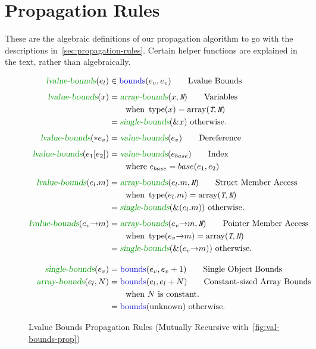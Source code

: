 \chapter{Propagation Rules}
\label{app:propagation-rules}

These are the algebraic definitions of our propagation algorithm to go
with the descriptions in~\autoref{sec:propagation-rules}. Certain
helper functions are explained in the text, rather than
algebraically.

\begin{figure}[ht]
\begin{align*}
  \lbounds(e_l) &\in \mbounds(e_v, e_v) \tag*{Lvalue Bounds} \\[1ex]
  \lbounds(x) &= \abounds(x, \mv{N}) \tag*{Variables} \\
                & \qquad \text{when } \typeof(x) = \arr(\mv{T}, \mv{N}) \\
                &= \sbounds(\addrof x) \text{ otherwise.} \\[1ex]
  \lbounds(\deref e_v) &= \vbounds(e_v) \tag*{Dereference} \\[1ex]
  \lbounds(e_1[e_2]) &= \vbounds(e_{base}) \tag*{Index} \\
                & \qquad \text{where } e_{base} = base(e_1, e_2) \\[1ex]
  \lbounds(e_l \member m) &= \abounds(e_l \member m, \mv{N}) \tag*{Struct Member Access} \\
                &\qquad \text{when } \typeof(e_l \member m) = \arr(\mv{T}, \mv{N}) \\
                &= \sbounds(\addrof (e_l \member m)) \text{ otherwise.} \\[1ex]
  \lbounds(e_v \arrow m) &= \abounds(e_v \arrow m, \mv{N}) \tag*{Pointer Member Access} \\
                &\qquad \text{when } \typeof(e_v \arrow m) = \arr(\mv{T}, \mv{N}) \\
                &= \sbounds(\addrof (e_v \arrow m)) \text{ otherwise.} \\[1em]
  \sbounds(e_v) &= \mbounds(e_v, e_v + 1) \tag*{Single Object Bounds} \\
  \abounds(e_l, N) &= \mbounds(e_l, e_l + N) \tag*{Constant-sized Array Bounds} \\
                & \qquad \text{when } N \text{ is constant.} \\
  &= \mbounds(\text{unknown}) \text{ otherwise.}
\end{align*}
\caption[Lvalue Bounds Propagation]{Lvalue Bounds Propagation Rules (Mutually
Recursive with~\autoref{fig:val-bounds-prop})}
\label{fig:lval-bounds-prop}
\end{figure}


